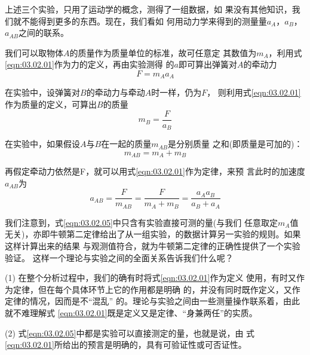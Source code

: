 上述三个实验，只用了运动学的概念，测得了一组数据，如
果没有其他知识，我们就不能得到更多的东西。现在，我们看如
何用动力学来得到的测量量$ a_A $，$ a_B $，$ a_{AB} $之间的联系。

我们可以取物体$ A $的质量作为质量单位的标准，故可任意定
其数值为$ m_A $，利用式\eqref{eqn:03.02.01}作为力的定义，再由实验测得
的$ a $即可算出弹簧对$ A $的牵动力
\begin{equation}\label{eqn:03.02.02}
  F = m _ { A } a _ { A }
\end{equation}

在实验中，设弹簧对$ B $的牵动力与牵动$ A $时一样，仍为$ F $，
则利用式\eqref{eqn:03.02.01}作为质量的定义，可算出$ B $的质量
\begin{equation}\label{eqn:03.02.03}
  m _ { B } = \frac { F } { a _ { B } }
\end{equation}

在实验中，如果假设$ A $与$ B $在一起的质量$ m_{AB} $是分别质量
之和(即质量是可加的)：
\begin{equation}\label{eqn:03.02.04}
  m _ { A B } = m _ { A } + m _ { B }
\end{equation}

再假定牵动力依然是F，就可以用式\eqref{eqn:03.02.01}作为定律，来预
言此时的加速度$ a_{AB} $为
\begin{equation}\label{eqn:03.02.05}
  a _ { A B } = \frac { F } { m _ { A B } } = \frac { F } { m _ { A } + m _ { B } } = \frac { a _ { A } a _ { B } } { a _ { B } + a _ { A } }
\end{equation}

我们注意到，式\eqref{eqn:03.02.05}中只含有实验直接可测的量(与我们
任意取定$ m_A $值无关)，亦即牛顿第二定律给出了从一组实验\lbr {}，\rbr 的数据计算另一实验\lbr {}\rbr 的规则。如果这样计算出来的结果
与观测值符合，就为牛顿第二定律的正确性提供了一个实验验证。
这样一个理论与实验之间的全面关系告诉我们什么呢？

(1) 在整个分析过程中，我们的确有时将式\eqref{eqn:03.02.01}作为定义
使用，有时又作为定律，但在每个具体环节上它的作用都是明确
的，并没有同时既作定义，又作定律的情况，因而是不“混乱”
的。理论与实验之间由一些测量操作联系着，由此就不难理解式
\eqref{eqn:03.02.01}既是定义又是定律、“身兼两任”的实质。

(2) 式\eqref{eqn:03.02.05}中都是实验可以直接测定的量，也就是说，由
式\\\eqref{eqn:03.02.01}所给出的预言是明确的，具有可验证性或可否证性。

